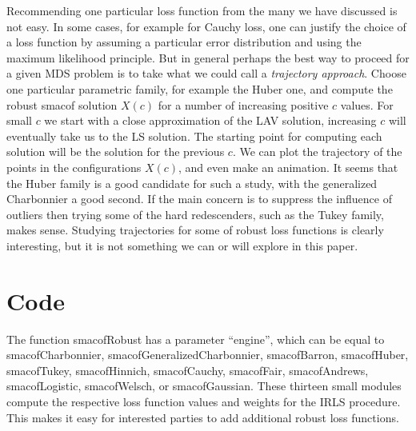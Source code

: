 \documentclass[
  12pt,
  letterpaper,
  DIV=11,
  numbers=noendperiod]{scrartcl}
\newcommand{\sectionbreak}{\pagebreak}
\theoremstyle{definition}
\theoremstyle{plain}
\theoremstyle{plain}
\theoremstyle{plain}
\theoremstyle{definition}
\theoremstyle{remark}
\begin{document}
Recommending one particular loss function from the many we have
discussed is not easy. In some cases, for example for Cauchy loss, one
can justify the choice of a loss function by assuming a particular error
distribution and using the maximum likelihood principle. But in general
perhaps the best way to proceed for a given MDS problem is to take what
we could call a \emph{trajectory approach}. Choose one particular
parametric family, for example the Huber one, and compute the robust
smacof solution \(X(c)\) for a number of increasing positive \(c\)
values. For small \(c\) we start with a close approximation of the LAV
solution, increasing \(c\) will eventually take us to the LS solution.
The starting point for computing each solution will be the solution for
the previous \(c\). We can plot the trajectory of the points in the
configurations \(X(c)\), and even make an animation. It seems that the
Huber family is a good candidate for such a study, with the generalized
Charbonnier a good second. If the main concern is to suppress the
influence of outliers then trying some of the hard redescenders, such as
the Tukey family, makes sense. Studying trajectories for some of robust
loss functions is clearly interesting, but it is not something we can or
will explore in this paper.

\sectionbreak

\section{Code}\label{code}

The function smacofRobust has a parameter ``engine'', which can be equal
to smacofCharbonnier, smacofGeneralizedCharbonnier, smacofBarron,
smacofHuber, smacofTukey, smacofHinnich, smacofCauchy, smacofFair,
smacofAndrews, smacofLogistic, smacofWelsch, or smacofGaussian. These
thirteen small modules compute the respective loss function values and
weights for the IRLS procedure. This makes it easy for interested
parties to add additional robust loss functions.
\end{document}
